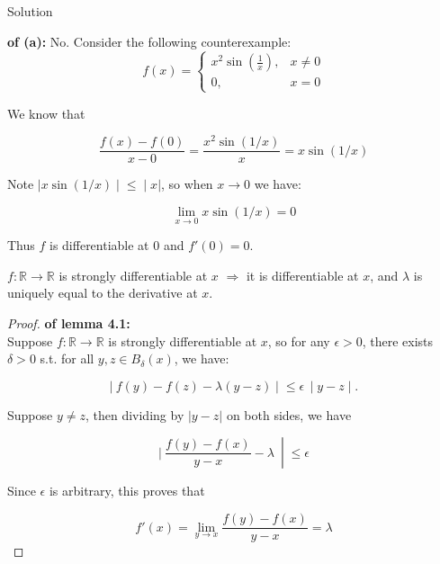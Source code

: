 \documentclass{qlnotes-export}
\begin{document}
\begin{qlsolution}{Solution}

\textbf{of (a):} No. Consider the following counterexample:\\

\[f(x) = \left\{ \begin{matrix}
{x^{2}\sin(\frac{1}{x}),} & {x \neq 0} \\
{0,} & {x = 0}
\end{matrix} \right.\]

We know that

\[\frac{f(x) - f(0)}{x - 0} = \frac{x^{2}\sin(1/x)}{x} = x\sin(1/x)\]

Note \(\left. |x\sin(1/x) \middle| \leq \middle| x| \right.\), so when \(x\rightarrow 0\) we have:

\[\lim\limits_{x\rightarrow 0}x\sin(1/x) = 0\]

Thus \(f\) is differentiable at \(0\) and \(f'(0) = 0\).

\begin{lemma}\label{lem-hw04-on-measurable-functions-lemma-001}

\(f:{\mathbb{R}}\rightarrow{\mathbb{R}}\) is strongly differentiable at \(x\) \(\Longrightarrow\) it is differentiable at \(x\), and \(\lambda\) is uniquely equal to the derivative at \(x\).

\end{lemma}

\begin{proof}

\textbf{of lemma 4.1:}\\
Suppose \(f:{\mathbb{R}}\rightarrow{\mathbb{R}}\) is strongly differentiable at \(x\), so for any \(\epsilon > 0\), there exists \(\delta > 0\) s.t. for all \(y,z \in B_{\delta}(x)\), we have:

\[\left. |\ f(y) - f(z) - \lambda(y - z) \middle| \leq \epsilon\, \middle| y - z \middle| . \right.\]

Suppose \(y \neq z\), then dividing by \(|y - z|\) on both sides, we have

\[\left. |\ \frac{f(y) - f(x)}{y - x} - \lambda\  \middle| \leq \epsilon \right.\]

Since \(\epsilon\) is arbitrary, this proves that

\[f'(x) = \lim\limits_{y\rightarrow x}\frac{f(y) - f(x)}{y - x} = \lambda\]

\end{proof}


\end{qlsolution}
\end{document}
